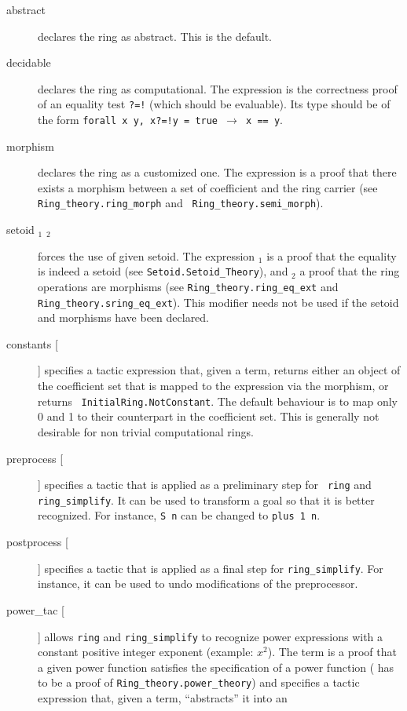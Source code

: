 \begin{description}
\item[abstract] declares the ring as abstract. This is the default.
\item[decidable \term] declares the ring as computational. The expression 
  \term{} is
  the correctness proof of an equality test {\tt ?=!} (which should be
  evaluable). Its type should be of
  the form {\tt forall x y, x?=!y = true $\rightarrow$ x == y}.
\item[morphism \term] declares the ring as a customized one. The expression 
  \term{} is
  a proof that there exists a morphism between a set of coefficient
  and the ring carrier (see {\tt Ring\_theory.ring\_morph} and {\tt
  Ring\_theory.semi\_morph}).
\item[setoid \term$_1$ \term$_2$] forces the use of given setoid. The 
  expression \term$_1$ is a proof that the equality is indeed a setoid
  (see {\tt Setoid.Setoid\_Theory}), and \term$_2$ a proof that the
  ring operations are morphisms (see {\tt Ring\_theory.ring\_eq\_ext} and
  {\tt Ring\_theory.sring\_eq\_ext}). This modifier needs not be used if the
  setoid and morphisms have been declared.
\item[constants [\ltac]] specifies a tactic expression that, given a term,
  returns either an object of the coefficient set that is mapped to
  the expression via the morphism, or returns {\tt
  InitialRing.NotConstant}. The default behaviour is to map only 0 and
  1 to their counterpart in the coefficient set. This is generally not
  desirable for non trivial computational rings.
\item[preprocess [\ltac]]
  specifies a tactic that is applied as a preliminary step for {\tt
  ring} and {\tt ring\_simplify}. It can be used to transform a goal
  so that it is better recognized. For instance, {\tt S n} can be
  changed to {\tt plus 1 n}.
\item[postprocess [\ltac]] specifies a tactic that is applied as a final step
  for {\tt ring\_simplify}. For instance, it can be used to undo
  modifications of the preprocessor.
\item[power\_tac {\term} [\ltac]] allows {\tt ring} and {\tt ring\_simplify} to
  recognize power expressions with a constant positive integer exponent 
  (example: $x^2$). The term {\term} is a proof that a given power function
  satisfies the specification of a power function ({\term} has to be a
  proof of {\tt Ring\_theory.power\_theory}) and {\ltac} specifies a
  tactic expression that, given a term, ``abstracts'' it into an

\end{description}

